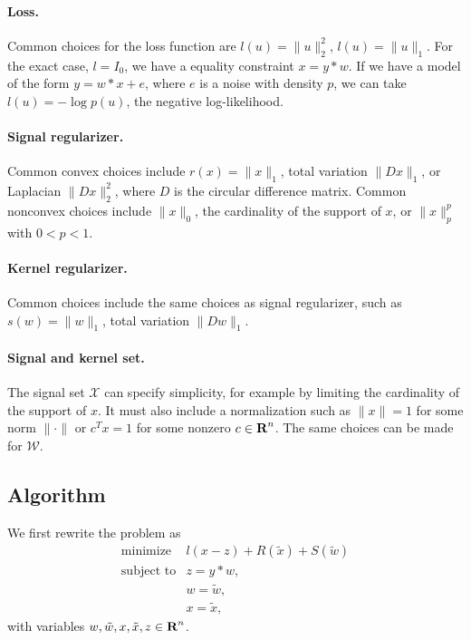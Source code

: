 \documentclass[12pt]{article}
\begin{document}
\paragraph{Loss.}
Common choices for the loss function are $l(u) = \|u\|_2^2$, $l(u) =\|u\|_1$. 
For the exact case, $l=I_0$, we have a equality constraint $x=y*w$.
If we have a model of the form $y=w*x+e$, where $e$ is a noise with
density $p$, we can take $l(u)=-\log p(u)$, the negative log-likelihood.

\paragraph{Signal regularizer.}
Common convex choices include
$r(x) = \|x\|_1$, total variation $\|Dx\|_1$, or Laplacian $\|Dx\|_2^2$, where $D$ is the
circular difference matrix.
Common nonconvex choices include $\|x\|_0$, the cardinality of the support of $x$, or 
$\|x\|_p^p$ with $0<p<1$.


\paragraph{Kernel regularizer.} 
Common choices include the same choices as signal regularizer, such as $s(w) = \|w\|_1$, total variation $\|Dw\|_1$. 

\paragraph{Signal and kernel set.}
The signal set  $\mathcal X$ can specify simplicity, for example by limiting the cardinality
of the support of $x$.  It must also include a normalization such as 
$\|x\|=1$ for some norm $\|\cdot \|$ or $c^Tx=1$ for some nonzero $c\in {\mbox{\bf R}}^n$.
The same choices can be made for $\mathcal W$.

\subsection{Algorithm}
We first rewrite the problem as
\[
\begin{array}{ll}
\mbox{minimize}   & l(x-z)+R(\tilde{x})+ S(\tilde{w}) \\
\mbox{subject to}  & z = y*w,\\
& w = \tilde{w},\\
& x = \tilde{x},
\end{array}
\]
with variables $w, \tilde{w}, x, \tilde{x}, z\in {\mbox{\bf R}}^n$.
\end{document}
